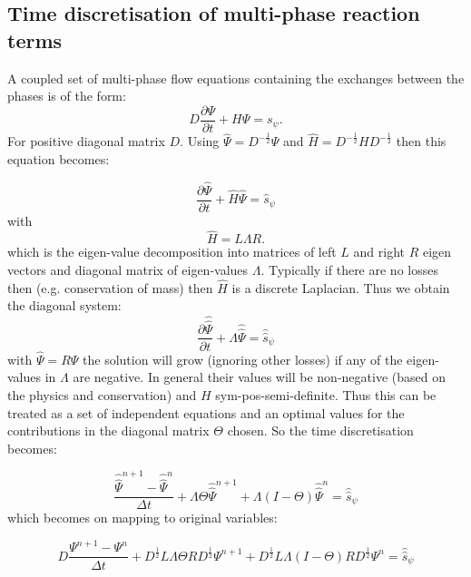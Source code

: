 \subsection{Time discretisation of multi-phase reaction terms}
A coupled set of multi-phase flow equations containing the exchanges between the phases is of the form: 
\begin{equation}
D \frac{\partial \Psi}{\partial t} + H \Psi = s_\psi. 
\label{w-rho-e-prob}
\end{equation}
For positive diagonal matrix $D$. Using $\hat \Psi = D^{-\frac{1}{2}} \Psi$ and $\hat H=D^{-\frac{1}{2}} H D^{-\frac{1}{2}}$ then this equation becomes: 

\begin{equation}
\frac{\partial \hat \Psi}{\partial t} + \hat H \hat \Psi = \hat s_\psi
\label{w-rho-e-prob}
\end{equation} 
with 
\begin{equation}
\hat H
= L \Lambda R. 
\label{stab_matrix}
\end{equation}
which is the eigen-value decomposition into matrices of left $L$ and right $R$ eigen vectors and diagonal matrix of eigen-values $\Lambda$. Typically if there are no losses then (e.g. conservation of mass) then $\hat H$ is a discrete Laplacian. Thus we obtain the diagonal system: 
\begin{equation}
\frac{\partial \hat {\hat \Psi}}{\partial t} + \Lambda \hat{\hat\Psi} = \hat{\hat s}_\psi
\label{e-prob}
\end{equation} 
with $\hat\Psi=R\Psi$ the solution will grow (ignoring other losses) if any of the eigen-values in $\Lambda$ are negative. In general their values will be non-negative (based on the physics and conservation) and $H$ sym-pos-semi-definite.  Thus this can be treated as a set of independent equations and an optimal values for the contributions in the diagonal matrix $\Theta$ chosen. So the time discretisation becomes:


\begin{equation}
\frac{\hat {\hat \Psi}^{n+1}-\hat {\hat \Psi}^{n}}{\Delta t} + \Lambda \Theta\hat{\hat\Psi}^{n+1} +\Lambda(I-\Theta) \hat{\hat\Psi}^n= \hat{\hat s}_\psi
\label{e-prob-time-term-opt-theta}
\end{equation} 
which becomes on mapping to original variables: 

\begin{equation}
D\frac{ { \Psi^{n+1}}- {\Psi^{n}}}{\Delta t} 
+ D^{\frac{1}{2}} L\Lambda \Theta R D^{\frac{1}{2}} {\Psi^{n+1}}
+ D^{\frac{1}{2}} L\Lambda (I-\Theta) R D^{\frac{1}{2}} {\Psi^{n}} 
= \hat{\hat s}_\psi
\label{e-prob-time-term-opt-theta-orig-var}
\end{equation} 

